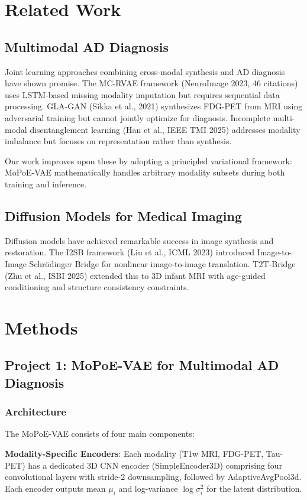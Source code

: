\documentclass[11pt,a4paper]{article}
\begin{document}
\section{Related Work}

\subsection{Multimodal AD Diagnosis}
Joint learning approaches combining cross-modal synthesis and AD diagnosis have shown promise. The MC-RVAE framework (NeuroImage 2023, 46 citations) uses LSTM-based missing modality imputation but requires sequential data processing. GLA-GAN (Sikka et al., 2021) synthesizes FDG-PET from MRI using adversarial training but cannot jointly optimize for diagnosis. Incomplete multi-modal disentanglement learning (Han et al., IEEE TMI 2025) addresses modality imbalance but focuses on representation rather than synthesis.

Our work improves upon these by adopting a principled variational framework: MoPoE-VAE mathematically handles arbitrary modality subsets during both training and inference.

\subsection{Diffusion Models for Medical Imaging}
Diffusion models have achieved remarkable success in image synthesis and restoration. The I2SB framework (Liu et al., ICML 2023) introduced Image-to-Image Schr\"odinger Bridge for nonlinear image-to-image translation. T2T-Bridge (Zhu et al., ISBI 2025) extended this to 3D infant MRI with age-guided conditioning and structure consistency constraints.

\section{Methods}

\subsection{Project 1: MoPoE-VAE for Multimodal AD Diagnosis}

\subsubsection{Architecture}
The MoPoE-VAE consists of four main components:

\textbf{Modality-Specific Encoders}: Each modality (T1w MRI, FDG-PET, Tau-PET) has a dedicated 3D CNN encoder (SimpleEncoder3D) comprising four convolutional layers with stride-2 downsampling, followed by AdaptiveAvgPool3d. Each encoder outputs mean $\mu_i$ and log-variance $\log\sigma_i^2$ for the latent distribution.
\end{document}

